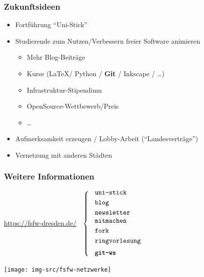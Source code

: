 \documentclass{beamer}
\begin{document}

\begin{frame}[label=ct3]
  \frametitle{Zukunftsideen}

  \begin{itemize}
  \item Fortführung "`Uni-Stick"'
  \item Studierende zum Nutzen/Verbessern freier Software animieren
    \begin{itemize}
    \item Mehr Blog-Beiträge
    \item Kurse (\LaTeX / Python /\textbf{ Git} / Inkscape / \dots)
    \item Infrastruktur-Stipendium
    \item OpenSource-Wettbewerb/Preis
    \item \dots
    \end{itemize}

    \bigskip

  \item Aufmerksamkeit erzeugen / Lobby-Arbeit ("`Landesverträge"')

    \bigskip

  \item Vernetzung mit anderen Städten

  \end{itemize}

\end{frame}


\begin{frame}[label=ct4]
  \frametitle{Weitere Informationen}

  \onslide<+->

  \begin{center}
    \url{https://fsfw-dresden.de/}
    $\;\;\left\{\;\;\text{
        \parbox{2.3cm}{
          \texttt{uni-stick}\\[1mm]
          \texttt{blog}\\[1mm]
          \texttt{newsletter}
          \texttt{mitmachen}\\[1mm]
          \texttt{fork}\\[1mm]
          \texttt{ringvorlesung}\\[2mm]
          \texttt{\textbf{git-ws}}\\[-3mm]
        }}
    \right.$

    \vspace*{2\bigskipamount}

    \texttt{[image: img-src/fsfw-netzwerke]}
  \end{center}

\end{frame}
\end{document}
